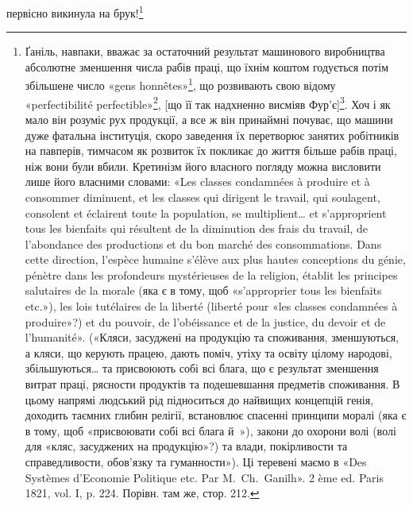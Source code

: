первісно викинула на брук!\footnote{
Ґаніль, навпаки, вважає за остаточний результат машинового виробництва
абсолютне зменшення числа рабів праці, що їхнім коштом годується
потім збільшене число «gens honnêtes»\footnote*{
порядних людей. 
}, що розвивають свою відому
«perfectibilité perfectible»\footnote*{
здібну вдосконалюватися здібність до вдосконалення. 
}, [що її так надхненно висміяв Фур’є]\footnote*{
Заведений у прямі дужки кінець речення беремо з французького
видання. 
}. Хоч і як мало він розуміє рух продукції, а все ж він принаймні почуває,
що машини дуже фатальна інституція, скоро заведення їх перетворює
занятих робітників на павперів, тимчасом як розвиток їх покликає до
життя більше рабів праці, ніж вони були вбили. Кретинізм його власного
погляду можна висловити лише його власними словами: «Les classes
condamnées à produire et à consommer diminuent, et les classes qui dirigent
le travail, qui soulagent, consolent et éclairent toute la population,
se multiplient\dots{} et s’approprient tous les bienfaits qui résultent de la diminution
des frais du travail, de l’abondance des productions et du bon marché
des consommations. Dans cette direction, l’espèce humaine s’élève aux plus
hautes conceptions du génie, pénètre dans les profondeurs mystérieuses de la
religion, établit les principes salutaires de la morale (яка є в тому, щоб «s’approprier
tous les bienfaits etc.»), les lois tutélaires de la liberté (liberté pour
«les classes condamnées à produire»?) et du pouvoir, de l’obéissance et de
la justice, du devoir et de l’humanité». («Кляси, засуджені на продукцію
та споживання, зменшуються, а кляси, що керують працею, дають поміч,
утіху та освіту цілому народові, збільшуються\dots{} та присвоюють собі
всі блага, що є результат зменшення витрат праці, рясности продуктів
та подешевшання предметів споживання. В цьому напрямі людський
рід підноситься до найвищих концепцій генія, доходить таємних глибин
релігії, встановлює спасенні принципи моралі (яка є в тому, щоб «присвоювати
собі всі блага й~»), закони до охорони волі (волі для «кляс,
засуджених на продукцію»?) та влади, покірливости та справедливости,
обов’язку та гуманности»). Ці теревені маємо в «Des Systèmes d’Economie
Politique etc. Par M.~Ch.~Ganilh». 2 ème ed. Paris 1821, vol. I, p. 224.
Порівн. там же, стор. 212.
}


